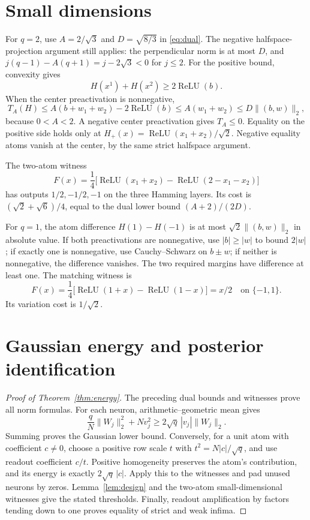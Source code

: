 \documentclass[11pt]{article}
\newcommand{\relu}{\operatorname{ReLU}}
\newcommand{\norm}[1]{\lVert #1\rVert}
\begin{document}
\section{Small dimensions}

For $q=2$, use $A=2/\sqrt3$ and $D=\sqrt{8/3}$ in
\eqref{eq:dual}. The negative halfspace-projection argument still
applies: the perpendicular norm is at most $D$, and
$j(q-1)-A(q+1)=j-2\sqrt3<0$ for $j\le2$.
For the positive bound, convexity gives
\[
 H(x^1)+H(x^2)\ge2\relu(b).
\]
When the center preactivation is nonnegative,
\[
 T_A(H)\le A(b+w_1+w_2)-2\relu(b)
          \le A(w_1+w_2)\le D\norm{(b,w)}_2,
\]
because $0<A<2$. A negative center preactivation gives $T_A\le0$.
Equality on the positive side holds only at
$H_+(x)=\relu(x_1+x_2)/\sqrt2$. Negative equality atoms vanish at
the center, by the same strict halfspace argument.

The two-atom witness
\[
 F(x)=\frac14\bigl[\relu(x_1+x_2)-\relu(2-x_1-x_2)\bigr]
\]
has outputs $1/2,-1/2,-1$ on the three Hamming layers. Its cost is
$(\sqrt2+\sqrt6)/4$, equal to the dual lower bound $(A+2)/(2D)$.

For $q=1$, the atom difference $H(1)-H(-1)$ is at most
$\sqrt2\norm{(b,w)}_2$ in absolute value. If both preactivations
are nonnegative, use $|b|\ge|w|$ to bound $2|w|$; if exactly one is
nonnegative, use Cauchy--Schwarz on $b\pm w$; if neither is
nonnegative, the difference vanishes. The two required margins
have difference at least one. The matching witness is
\[
 F(x)=\frac14\bigl[\relu(1+x)-\relu(1-x)\bigr]=x/2
 \quad\text{on }\{-1,1\}.
\]
Its variation cost is $1/\sqrt2$.

\section{Gaussian energy and posterior identification}

\begin{proof}[Proof of Theorem~\ref{thm:energy}]
The preceding dual bounds and witnesses prove all norm formulas.
For each neuron, arithmetic--geometric mean gives
\[
 \frac qN\norm{W_j}_2^2+Nv_j^2
       \ge2\sqrt q\,|v_j|\norm{W_j}_2.
\]
Summing proves the Gaussian lower bound. Conversely, for a unit
atom with coefficient $c\ne0$, choose a positive row scale $t$
with $t^2=N|c|/\sqrt q$, and use readout coefficient $c/t$.
Positive homogeneity preserves the atom's contribution, and its
energy is exactly $2\sqrt q\,|c|$. Apply this to the witnesses and
pad unused neurons by zeros. Lemma~\ref{lem:design} and the
two-atom small-dimensional witnesses give the stated thresholds.
Finally, readout amplification by factors tending down to one
proves equality of strict and weak infima.
\end{proof}
\end{document}
